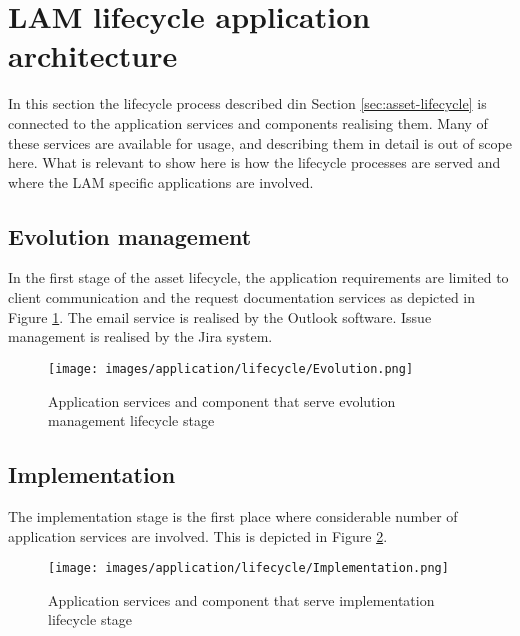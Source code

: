 	\section{LAM lifecycle application architecture}
	\label{sec:application-lifecycle}
	
	In this section the lifecycle process described din Section \ref{sec:asset-lifecycle} is connected to the application services and components realising them. Many of these services are available for usage, and describing them in detail is out of scope here. What is relevant to show here is how the lifecycle processes are served and where the LAM specific applications are involved.
	
	\subsection{Evolution management}
	
	In the first stage of the asset lifecycle, the application requirements are limited to client communication and the request documentation services as depicted in Figure \ref{fig:app-evolution-management}. The email service is realised by the Outlook software. Issue management is realised by the Jira system.
	
    \begin{figure}[!h]
		\centering
		\texttt{[image: images/application/lifecycle/Evolution.png]}
		\caption{Application services and component that serve evolution management lifecycle stage}
		\label{fig:app-evolution-management}
	\end{figure}

	
	\subsection{Implementation}
	\label{sec:implementation}
	
	The implementation stage is the first place where considerable number of application services are involved. This is depicted in Figure \ref{fig:app-implementation}. 
	
    \begin{figure}[!h]
		\centering
		\texttt{[image: images/application/lifecycle/Implementation.png]}
		\caption{Application services and component that serve implementation lifecycle stage}
		\label{fig:app-implementation}
	\end{figure}
	
